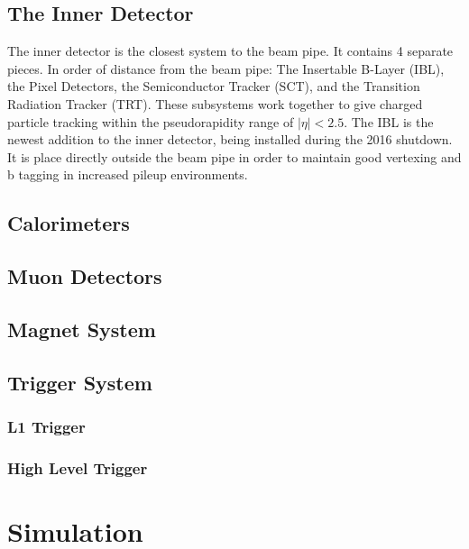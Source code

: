 \subsection{The Inner Detector}
The inner detector is the closest system to the beam pipe. It contains 4 separate pieces. In order of distance from the beam pipe: The Insertable B-Layer (IBL), the Pixel Detectors, the Semiconductor Tracker (SCT), and the Transition Radiation Tracker (TRT). These subsystems work together to give charged particle tracking within the pseudorapidity range of ${|\eta| < 2.5}$.
\indent The IBL is the newest addition to the inner detector, being installed during the 2016 shutdown. It is place directly outside the beam pipe in order to maintain good vertexing and b tagging in increased pileup environments.
\subsection{Calorimeters}
\subsection{Muon Detectors}
\subsection{Magnet System}
\subsection{Trigger System}
\subsubsection{L1 Trigger}
\subsubsection{High Level Trigger}
\section{Simulation}




